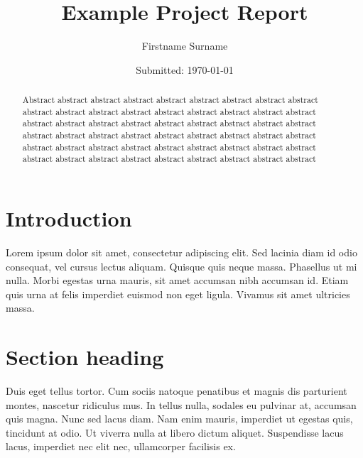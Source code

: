\documentclass[12pt, onecolumn]{revtex4}    %
\begin{document}
                     


\title{Example Project Report} 
\date{Submitted: \today{}}
\author{Firstname Surname}

\begin{abstract}              
 
Abstract abstract abstract abstract abstract abstract abstract abstract abstract abstract abstract abstract abstract abstract abstract abstract abstract abstract abstract abstract abstract abstract abstract abstract abstract abstract abstract abstract abstract abstract abstract abstract abstract abstract abstract abstract abstract abstract abstract abstract abstract abstract abstract abstract abstract abstract abstract abstract abstract abstract abstract abstract abstract abstract 

\end{abstract}


\maketitle

\tableofcontents
\let\toc@pre\relax
\let\toc@post\relax

\newpage

\section{Introduction} 

Lorem ipsum dolor sit amet, consectetur adipiscing elit. Sed lacinia diam id odio consequat, vel cursus lectus aliquam. Quisque quis neque massa. Phasellus ut mi nulla. Morbi egestas urna mauris, sit amet accumsan nibh accumsan id. Etiam quis urna at felis imperdiet euismod non eget ligula. Vivamus sit amet ultricies massa. 

\section{Section heading} 

Duis eget tellus tortor. Cum sociis natoque penatibus et magnis dis parturient montes, nascetur ridiculus mus. In tellus nulla, sodales eu pulvinar at, accumsan quis magna. Nunc sed lacus diam. Nam enim mauris, imperdiet ut egestas quis, tincidunt at odio. Ut viverra nulla at libero dictum aliquet. Suspendisse lacus lacus, imperdiet nec elit nec, ullamcorper facilisis ex. 
\end{document}
